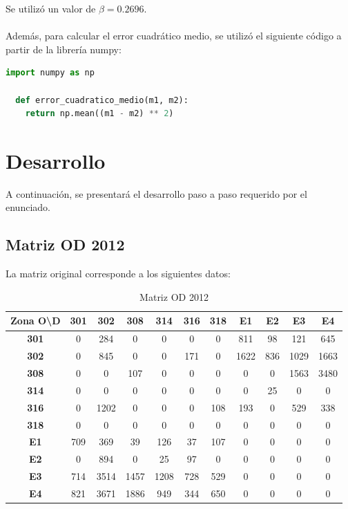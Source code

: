 \documentclass[12pt]{article} %
\begin{document}
Se utilizó un valor de \(\beta = 0.2696\).
\\ \\
Además, para calcular el error cuadrático medio, se utilizó el siguiente código a partir de la librería numpy:

\begin{lstlisting}[language=Python]
  import numpy as np

  def error_cuadratico_medio(m1, m2):
    return np.mean((m1 - m2) ** 2)
\end{lstlisting}

\newpage
\section{Desarrollo}

A continuación, se presentará el desarrollo paso a paso requerido por el enunciado.

\subsection{Matriz OD 2012}

La matriz original corresponde a los siguientes datos:

\begin{table}[H]
  \centering
  \footnotesize
  \begin{tabular}{c|cccccccccc}    
  \textbf{Zona O\textbackslash D} & \textbf{301} & \textbf{302} & \textbf{308} & \textbf{314} & \textbf{316} & \textbf{318} & \textbf{E1} & \textbf{E2} & \textbf{E3} & \textbf{E4} \\ \hline
  \textbf{301} & 0 & 284 & 0 & 0 & 0 & 0 & 811 & 98 & 121 & 645 \\ 
  \textbf{302} & 0 & 845 & 0 & 0 & 171 & 0 & 1622 & 836 & 1029 & 1663 \\ 
  \textbf{308} & 0 & 0 & 107 & 0 & 0 & 0 & 0 & 0 & 1563 & 3480 \\ 
  \textbf{314} & 0 & 0 & 0 & 0 & 0 & 0 & 0 & 25 & 0 & 0 \\ 
  \textbf{316} & 0 & 1202 & 0 & 0 & 0 & 108 & 193 & 0 & 529 & 338 \\ 
  \textbf{318} & 0 & 0 & 0 & 0 & 0 & 0 & 0 & 0 & 0 & 0 \\ 
  \textbf{E1} & 709 & 369 & 39 & 126 & 37 & 107 & 0 & 0 & 0 & 0 \\ 
  \textbf{E2} & 0 & 894 & 0 & 25 & 97 & 0 & 0 & 0 & 0 & 0 \\ 
  \textbf{E3} & 714 & 3514 & 1457 & 1208 & 728 & 529 & 0 & 0 & 0 & 0 \\ 
  \textbf{E4} & 821 & 3671 & 1886 & 949 & 344 & 650 & 0 & 0 & 0 & 0 \\ 
  \end{tabular}
  \caption{Matriz OD 2012}
  \label{table:M_2012}
\end{table}
\end{document}
